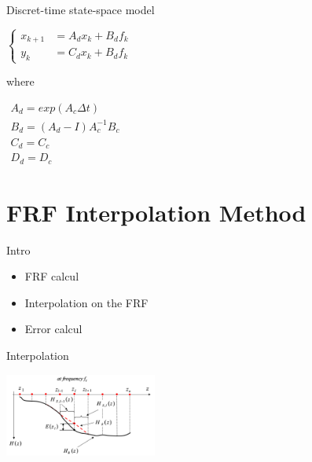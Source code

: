 \documentclass{beamer}
\begin{document}
\begin{frame}{Discret-time state-space model}

\begin{center}
$\left\{
\begin{array}{ll}
x_{k+1} & = A_dx_k + B_df_k \\
y_k & = C_dx_k + B_df_k
\end{array}
\right.$

\vspace{5mm}

where

\vspace{5mm}

$\begin{array}{ll}
A_d = exp(A_c \Delta t) \\
B_d= (A_d - I) A^{-1}_c B_c \\
C_d = C_c \\
D_d = D_c
\end{array}$

\end{center}


\end{frame}

\section{FRF Interpolation Method}


\begin{frame}{Intro}

\begin{itemize}
\item FRF calcul
\item Interpolation on the FRF
\item Error calcul
\end{itemize}

\end{frame}


\begin{frame}{Interpolation}
\begin{center}
\includegraphics[width=5cm]{images/interpolation.png}
\end{center}

\end{frame}
\end{document}
